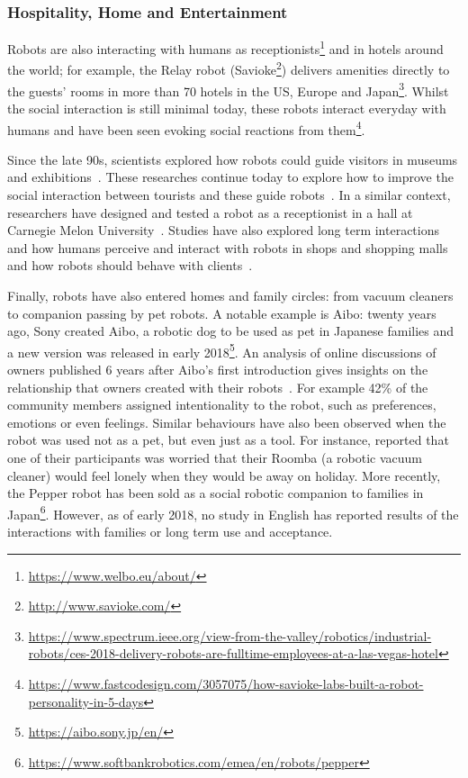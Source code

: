 \subsubsection{Hospitality, Home and Entertainment} 

Robots are also interacting with humans as receptionists\footnote{\url{https://www.welbo.eu/about/}} and in hotels around the world; for example, the Relay robot (Savioke\footnote{\url{http://www.savioke.com/}}) delivers amenities directly to the guests' rooms in more than 70 hotels in the US, Europe and Japan\footnote{\url{https://www.spectrum.ieee.org/view-from-the-valley/robotics/industrial-robots/ces-2018-delivery-robots-are-fulltime-employees-at-a-las-vegas-hotel}}. Whilst the social interaction is still minimal today, these robots interact everyday with humans and have been seen evoking social reactions from them\footnote{\url{https://www.fastcodesign.com/3057075/how-savioke-labs-built-a-robot-personality-in-5-days}}. 

Since the late 90s, scientists explored how robots could guide visitors in museums and exhibitions~\citep{thrun1999minerva,burgard1999experiences}. These researches continue today to explore how to improve the social interaction between tourists and these guide robots~\citep{bennewitz2005towards}. In a similar context, researchers have designed and tested a robot as a receptionist in a hall at Carnegie Melon University~\citep{gockley2005designing}. Studies have also explored long term interactions and how humans perceive and interact with robots in shops and shopping malls~\citep{kanda2009affective} and how robots should behave with clients~\citep{kanda2008will}.

Finally, robots have also entered homes and family circles: from vacuum cleaners to companion passing by pet robots. A notable example is Aibo: twenty years ago, Sony created Aibo, a robotic dog to be used as pet in Japanese families and a new version was released in early 2018\footnote{\url{https://aibo.sony.jp/en/}}. An analysis of online discussions of owners published 6 years after Aibo's first introduction gives insights on the relationship that owners created with their robots~\citep{friedman2003hardware}. For example 42\% of the community members assigned intentionality to the robot, such as preferences, emotions or even feelings. Similar behaviours have also been observed when the robot was used not as a pet, but even just as a tool. For instance, \cite{fink2013living} reported that one of their participants was worried that their Roomba (a robotic vacuum cleaner) would feel lonely when they would be away on holiday. More recently, the Pepper robot has been sold as a social robotic companion to families in Japan\footnote{\url{https://www.softbankrobotics.com/emea/en/robots/pepper}}. However, as of early 2018, no study in English has reported results of the interactions with families or long term use and acceptance.


